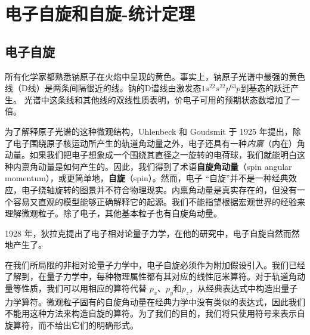 \chapter{电子自旋和自旋-统计定理}
\label{chap:10}
\section{电子自旋}
\label{sec:10.1 Electron Spin}

    所有化学家都熟悉钠原子在火焰中呈现的黄色。事实上，钠原子光谱中最强的黄色线（D线）是两条间隔很近的线。钠的D谱线由激发态$1s^22s^22p^63p$到基态的跃迁产生。 光谱中这条线和其他线的双线性质表明，价电子可用的预期状态数增加了一倍。

    为了解释原子光谱的这种微观结构，Uhlenbeck 和 Goudsmit 于 1925 年提出，除了电子围绕原子核运动所产生的轨道角动量之外，电子还具有一种\textit{内禀}（内在）角动量。如果我们把电子想象成一个围绕其直径之一旋转的电荷球，我们就能明白这种内禀角动量是如何产生的。因此，我们得到了术语\textbf{自旋角动量}（spin angular momentum），或更简单地，\textbf{自旋}（spin）。然而，电子 “自旋”并不是一种经典效应，电子绕轴旋转的图景并不符合物理现实。内禀角动量是真实存在的，但没有一个容易又直观的模型能够正确解释它的起源。我们不能指望根据宏观世界的经验来理解微观粒子。除了电子，其他基本粒子也有自旋角动量。

    1928 年，狄拉克提出了电子相对论量子力学，在他的研究中，电子自旋自然而然地产生了。

    在我们所局限的非相对论量子力学中，电子自旋必须作为附加假设引入。我们已经了解到，在量子力学中，每种物理属性都有其对应的线性厄米算符。对于轨道角动量等性质，我们可以用相应的算符代替 $p_x$、$p_y$和$p_z$，从经典表达式中构造出量子力学算符。微观粒子固有的自旋角动量在经典力学中没有类似的表达式，因此我们不能用这种方法来构造自旋的算符。为了我们的目的，我们将只使用符号来表示自旋算符，而不给出它们的明确形式。

